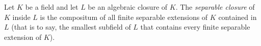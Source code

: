 \documentclass[12pt]{article}
\begin{document}
Let $K$ be a field and let $L$ be an algebraic closure of $K$. The {\em separable closure} of $K$ inside $L$ is the compositum of all finite separable extensions of $K$ contained in $L$ (that is to say, the smallest subfield of $L$ that contains every finite separable extension of $K$).
\end{document}
